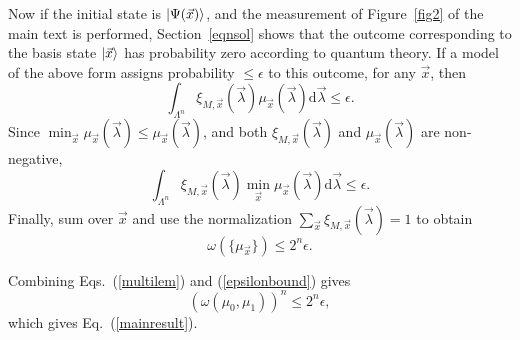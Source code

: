 \documentclass[amsmath,amssymb,superscriptaddress,pra,12pt]{revtex4-1}
\begin{document}
Now if the initial state is $\ket{\Psi(\vec{x})}$, and the measurement of Figure~\ref{fig2} of the main text is performed, Section~\ref{eqnsol} shows that the outcome corresponding to the basis state $\ket{\vec{x}}$ has probability zero according to quantum theory. If a model of the above form assigns probability $\leq \epsilon$ to this outcome, for any $\vec{x}$, then
\begin{equation}
\int_{\Lambda^n} \xi_{M,\vec{x}}(\vec{\lambda}) \mu_{\vec{x}}(\vec{\lambda}) \mathrm{d}\vec{\lambda} \leq \epsilon.
\end{equation}
Since $\min_{\vec{x}} \mu_{\vec{x}}(\vec{\lambda}) \leq \mu_{\vec{x}}(\vec{\lambda})$, and both $\xi_{M,\vec{x}}(\vec{\lambda})$ and $\mu_{\vec{x}}(\vec{\lambda})$ are non-negative,
\begin{equation}
\int_{\Lambda^n} \xi_{M,\vec{x}}(\vec{\lambda}) \min_{\vec{x}} \mu_{\vec{x}}(\vec{\lambda}) \mathrm{d}\vec{\lambda} \leq \epsilon.
\end{equation}
Finally, sum over $\vec{x}$ and use the normalization $\sum_{\vec{x}} \xi_{M,\vec{x}}(\vec{\lambda}) = 1$ to obtain
\begin{equation}\label{epsilonbound}
\omega\left( \{ \mu_{\vec{x}} \} \right) \leq 2^n \epsilon.
\end{equation}


Combining Eqs.~(\ref{multilem}) and (\ref{epsilonbound}) gives
\begin{equation}
(\omega(\mu_0,\mu_1))^n \leq 2^n \epsilon,
\end{equation}
which gives Eq.~(\ref{mainresult}).
\end{document}
